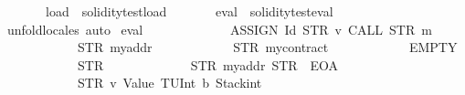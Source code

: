 \begin{isabellebody}
\ \ \ \ \ \ \ load{}\ {\isacharequal}{\kern0pt}\ soliditytest{}{\isachardot}{\kern0pt}load\isanewline
\ \ \ \ \ \ \ eval{}\ {\isacharequal}{\kern0pt}\ soliditytest{}{\isachardot}{\kern0pt}eval\isanewline
%
\isadelimproof
\ \ %
\endisadelimproof
%
\isatagproof
{}\isamarkupfalse%
\ unfold{\isacharunderscore}{\kern0pt}locales\ auto%
\endisatagproof
{\isafoldproof}%
%
\isadelimproof
\isanewline
%
\endisadelimproof
\isanewline
{}\isamarkupfalse%
\ {\isachardoublequoteopen}eval{}\ {}{}{}{}\isanewline
\ \ \ \ \ \ \ \ \ \ \ \ {\isacharparenleft}{\kern0pt}ASSIGN\ {\isacharparenleft}{\kern0pt}Id\ {\isacharparenleft}{\kern0pt}STR\ {\isacharprime}{\kern0pt}{\isacharprime}{\kern0pt}v{}{\isacharprime}{\kern0pt}{\isacharprime}{\kern0pt}{\isacharparenright}{\kern0pt}{\isacharparenright}{\kern0pt}\ {\isacharparenleft}{\kern0pt}CALL\ {\isacharparenleft}{\kern0pt}STR\ {\isacharprime}{\kern0pt}{\isacharprime}{\kern0pt}m{}{\isacharprime}{\kern0pt}{\isacharprime}{\kern0pt}{\isacharparenright}{\kern0pt}\ {\isacharbrackleft}{\kern0pt}{\isacharbrackright}{\kern0pt}{\isacharparenright}{\kern0pt}{\isacharparenright}{\kern0pt}\isanewline
\ \ \ \ \ \ \ \ \ \ \ \ {\isacharparenleft}{\kern0pt}STR\ {\isacharprime}{\kern0pt}{\isacharprime}{\kern0pt}myaddr{\isacharprime}{\kern0pt}{\isacharprime}{\kern0pt}{\isacharparenright}{\kern0pt}\isanewline
\ \ \ \ \ \ \ \ \ \ \ \ {\isacharparenleft}{\kern0pt}STR\ {\isacharprime}{\kern0pt}{\isacharprime}{\kern0pt}mycontract{\isacharprime}{\kern0pt}{\isacharprime}{\kern0pt}{\isacharparenright}{\kern0pt}\isanewline
\ \ \ \ \ \ \ \ \ \ \ \ EMPTY\isanewline
\ \ \ \ \ \ \ \ \ \ \ \ {\isacharparenleft}{\kern0pt}STR\ {\isacharprime}{\kern0pt}{\isacharprime}{\kern0pt}{}{\isacharprime}{\kern0pt}{\isacharprime}{\kern0pt}{\isacharparenright}{\kern0pt}\isanewline
\ \ \ \ \ \ \ \ \ \ \ \ {\isacharbrackleft}{\kern0pt}{\isacharparenleft}{\kern0pt}STR\ {\isacharprime}{\kern0pt}{\isacharprime}{\kern0pt}myaddr{\isacharprime}{\kern0pt}{\isacharprime}{\kern0pt}{\isacharcomma}{\kern0pt}\ STR\ {\isacharprime}{\kern0pt}{\isacharprime}{\kern0pt}{}{}{}{\isacharprime}{\kern0pt}{\isacharprime}{\kern0pt}{\isacharcomma}{\kern0pt}\ EOA{\isacharcomma}{\kern0pt}\ {}{\isacharparenright}{\kern0pt}{\isacharbrackright}{\kern0pt}\isanewline
\ \ \ \ \ \ \ \ \ \ \ \ {\isacharbrackleft}{\kern0pt}{\isacharparenleft}{\kern0pt}STR\ {\isacharprime}{\kern0pt}{\isacharprime}{\kern0pt}v{}{\isacharprime}{\kern0pt}{\isacharprime}{\kern0pt}{\isacharcomma}{\kern0pt}\ {\isacharparenleft}{\kern0pt}Value\ {\isacharparenleft}{\kern0pt}TUInt\ b{}{\isacharparenright}{\kern0pt}{\isacharcomma}{\kern0pt}\ Stackint\ {}{\isacharparenright}{\kern0pt}{\isacharparenright}{\kern0pt}{\isacharbrackright}{\kern0pt}\isanewline

\end{isabellebody}
